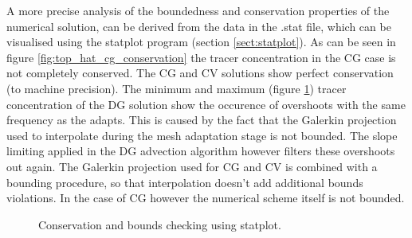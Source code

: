 A more precise analysis of the boundedness and conservation properties of the numerical solution, can be
derived from the data in the .stat file, which can be visualised using the statplot program 
(section \ref{sect:statplot}). As can be seen in figure \ref{fig:top_hat_cg_conservation} the tracer
concentration in the CG case is not completely conserved. 
The CG and CV solutions show perfect conservation (to machine precision). The minimum 
and maximum (figure \ref{fig:top_hat_dg_max}) tracer concentration of the
DG solution show the occurence of overshoots with the same frequency as the adapts. This is caused by the
fact that the Galerkin projection used to interpolate during the mesh adaptation stage is not 
bounded. The slope limiting applied in the DG advection algorithm however filters these overshoots 
out again. The Galerkin projection used for CG and CV is combined with a bounding procedure, so 
that interpolation doesn't add additional bounds violations. In the case of CG however the numerical 
scheme itself is not bounded.

\begin{figure}
  \centering
    \label{fig:top_hat_cg_conservation}
    \label{fig:top_hat_dg_max}
  \caption{Conservation and bounds checking using statplot.}
\end{figure}

